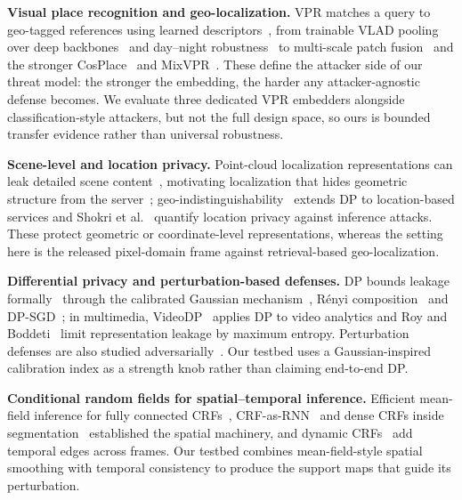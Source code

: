 \documentclass[10pt,journal]{IEEEtran}
\begin{document}
\textbf{Visual place recognition and geo-localization.}
VPR matches a query to geo-tagged references using learned
descriptors~\cite{lowry2016visual,masone2021survey}, from trainable VLAD
pooling over deep backbones~\cite{arandjelovic2016netvlad,he2016deep} and
day--night robustness~\cite{torii201524} to multi-scale patch
fusion~\cite{hausler2021patchnetvlad} and the stronger
CosPlace~\cite{berton2022rethinking} and MixVPR~\cite{ali2023mixvpr}. These
define the attacker side of our threat model: the stronger the embedding, the
harder any attacker-agnostic defense becomes. We evaluate three dedicated VPR
embedders alongside classification-style attackers, but not the full design
space, so ours is bounded transfer evidence rather than universal robustness.

\textbf{Scene-level and location privacy.}
Point-cloud localization representations can leak detailed scene
content~\cite{pittaluga2019revealing}, motivating localization that hides
geometric structure from the server~\cite{speciale2019privacy};
geo-indistinguishability~\cite{andres2013geo} extends DP to location-based
services and Shokri et al.~\cite{shokri2011quantifying} quantify location
privacy against inference attacks. These protect geometric or coordinate-level
representations, whereas the setting here is the released pixel-domain frame
against retrieval-based geo-localization.

\textbf{Differential privacy and perturbation-based defenses.}
DP bounds leakage formally~\cite{dwork2014algorithmic} through the calibrated
Gaussian mechanism~\cite{balle2018improving}, R\'{e}nyi
composition~\cite{mironov2017renyi} and DP-SGD~\cite{abadi2016deep}; in
multimedia, VideoDP~\cite{wang2020videodp} applies DP to video analytics and
Roy and Boddeti~\cite{roy2019mitigating} limit representation leakage by
maximum entropy. Perturbation defenses are also studied
adversarially~\cite{goodfellow2015explaining,madry2018towards}. Our testbed
uses a Gaussian-inspired calibration index as a strength knob rather than
claiming end-to-end DP.

\textbf{Conditional random fields for spatial--temporal inference.}
Efficient mean-field inference for fully connected
CRFs~\cite{krahenbuhl2011efficient}, CRF-as-RNN~\cite{zheng2015conditional}
and dense CRFs inside segmentation~\cite{chen2017deeplab} established the
spatial machinery, and dynamic CRFs~\cite{wang2005dynamic} add temporal edges
across frames. Our testbed combines mean-field-style spatial smoothing with
temporal consistency to produce the support maps that guide its perturbation.
\end{document}
